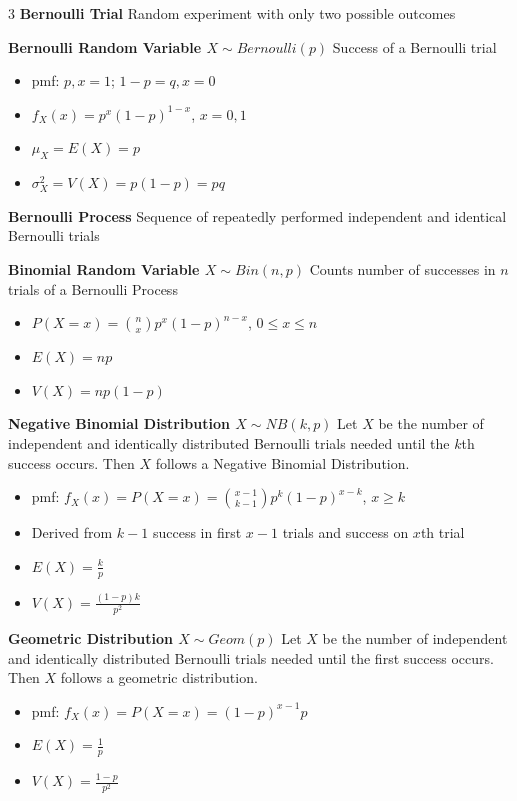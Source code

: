 \documentclass[10pt, landscape]{article}
\begin{document}
\begin{multicols*}{3}
\textbf{Bernoulli Trial} Random experiment with only two possible outcomes

\textbf{Bernoulli Random Variable $X \sim Bernoulli(p)$} Success of a Bernoulli trial
\begin{itemize}
    \item pmf: $p, x= 1$; $1-p=q, x = 0$
    \item $f_X(x)=p^x(1-p)^{1-x}$, $x=0, 1$
    \item $\mu_X=E(X)=p$
    \item $\sigma_X^2=V(X)=p(1-p)=pq$
\end{itemize}

\textbf{Bernoulli Process} Sequence of repeatedly performed independent and identical Bernoulli trials

\textbf{Binomial Random Variable $X\sim Bin(n, p)$} Counts number of successes in $n$ trials of a Bernoulli Process
\begin{itemize}
    \item $P(X=x)={n\choose x}p^x(1-p)^{n-x}$, $0 \leq x \leq n$
    \item $E(X)=np$
    \item $V(X)=np(1-p)$
\end{itemize}

\textbf{Negative Binomial Distribution $X\sim NB(k, p)$} Let $X$ be the number of independent and identically distributed Bernoulli trials needed until the $k$th success occurs. Then $X$ follows a Negative Binomial Distribution.
\begin{itemize}
    \item pmf: $f_X(x)=P(X=x)={x-1 \choose k-1}p^k(1-p)^{x-k}$, $x\geq k$
    \item Derived from $k-1$ success in first $x-1$ trials and success on $x$th trial
    \item $E(X)=\frac{k}{p}$
    \item $V(X)=\frac{(1-p)k}{p^2}$
\end{itemize}

\textbf{Geometric Distribution $X\sim Geom(p)$} Let $X$ be the number of independent and identically distributed Bernoulli trials needed until the first success occurs. Then $X$ follows a geometric distribution.
\begin{itemize}
    \item pmf: $f_X(x)=P(X=x)=(1-p)^{x-1}p$
    \item $E(X)=\frac{1}{p}$
    \item $V(X)=\frac{1-p}{p^2}$
\end{itemize}


\end{multicols*}
\end{document}
